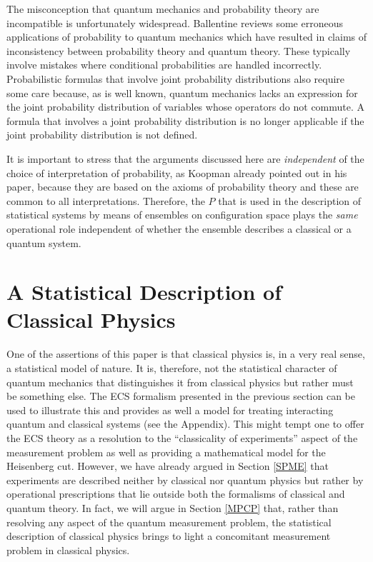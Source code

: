 \documentclass [12pt]{revtex4}
\begin{document}
The misconception that quantum mechanics and probability theory are incompatible is unfortunately widespread. Ballentine reviews some erroneous applications of probability to quantum mechanics which have resulted in claims of inconsistency between probability theory and quantum theory. These typically involve mistakes where conditional probabilities are handled incorrectly. Probabilistic formulas that involve joint probability distributions also require some care because, as is well known, quantum mechanics lacks an expression for the joint probability distribution of variables whose operators do not commute. A formula that involves a joint probability distribution is no longer applicable if the joint probability distribution is not defined.

It is important to stress that the arguments discussed here are {\it independent} of  the choice of interpretation of probability, as Koopman already pointed out in his paper, because they are based on the axioms of probability theory and these are common to all interpretations. Therefore, the $P$ that is used in the description of statistical systems by means of ensembles on configuration space plays the {\it same} operational role independent of whether the ensemble describes a classical or a quantum system.

\section{A Statistical Description of Classical Physics}\label{stat}

One of the assertions of this paper is that classical physics is, in a very real sense,
a statistical model of nature.  It is, therefore, not the statistical character of
quantum mechanics that distinguishes it from classical physics but rather must be something else.
The ECS formalism presented in the previous section can be used to illustrate this
and provides as well a model for treating interacting quantum and classical systems
(see the Appendix).
This might tempt one to offer the ECS theory as a resolution to the ``classicality of experiments''
aspect of the measurement problem as well as providing a mathematical model for the Heisenberg cut.
However, we have already argued in Section \ref{SPME} that experiments
are described neither by classical nor quantum physics but rather by operational prescriptions that lie
outside both the formalisms of classical and quantum theory.  In fact, we will argue in Section \ref{MPCP} that, rather
than resolving any aspect of the quantum measurement problem, the statistical description of classical
physics brings to light a concomitant measurement problem in classical physics.
\end{document}
